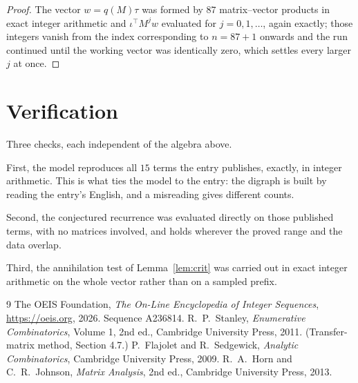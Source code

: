 \documentclass[11pt,a4paper]{article}
\theoremstyle{plain}
\theoremstyle{definition}
\begin{document}
\begin{proof}
The vector $w=q(M)\tau$ was formed by $87$ matrix--vector products in exact integer
arithmetic and $\iota^{\!\top}M^{j}w$ evaluated for $j=0,1,\dots$, again exactly; those
integers vanish from the index corresponding to $n=87+1$ onwards and the run continued
until the working vector was identically zero, which settles every larger $j$ at once.
\end{proof}

\section{Verification}

Three checks, each independent of the algebra above.

First, the model reproduces all $15$ terms the entry publishes, exactly, in integer
arithmetic. This is what ties the model to the entry: the digraph is built by reading the
entry's English, and a misreading gives different counts.

Second, the conjectured recurrence was evaluated directly on those published terms, with no
matrices involved, and holds wherever the proved range and the data overlap.

Third, the annihilation test of Lemma~\ref{lem:crit} was carried out in exact integer
arithmetic on the whole vector rather than on a sampled prefix.

\begin{thebibliography}{9}
 The OEIS Foundation, \emph{The On-Line Encyclopedia of Integer
Sequences}, \url{https://oeis.org}, 2026. Sequence A236814.
 R.~P.~Stanley, \emph{Enumerative Combinatorics}, Volume 1, 2nd ed.,
Cambridge University Press, 2011. (Transfer-matrix method, Section 4.7.)
 P.~Flajolet and R.~Sedgewick, \emph{Analytic Combinatorics}, Cambridge
University Press, 2009.
 R.~A.~Horn and C.~R.~Johnson, \emph{Matrix Analysis}, 2nd ed., Cambridge
University Press, 2013.
\end{thebibliography}
\end{document}

